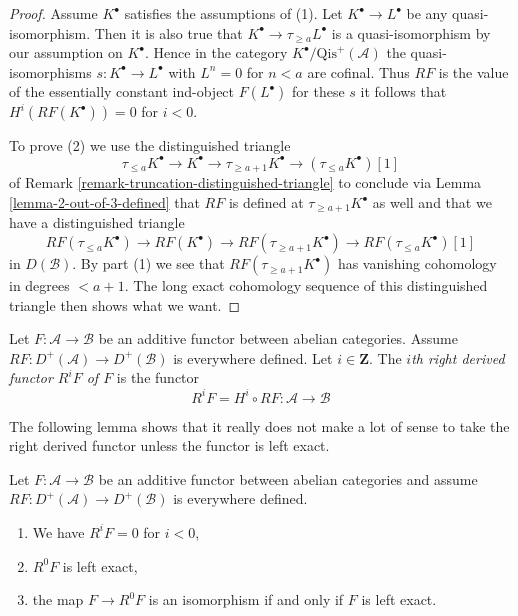 \begin{proof}
Assume $K^\bullet$ satisfies the assumptions of (1).
Let $K^\bullet \to L^\bullet$ be any quasi-isomorphism.
Then it is also true that $K^\bullet \to \tau_{\geq a}L^\bullet$
is a quasi-isomorphism by our assumption on $K^\bullet$.
Hence in the category $K^\bullet/\text{Qis}^{+}(\mathcal{A})$ the
quasi-isomorphisms $s : K^\bullet \to L^\bullet$ with $L^n = 0$ for $n < a$
are cofinal. Thus $RF$ is the value of the essentially constant
ind-object $F(L^\bullet)$ for these $s$ it follows that
$H^i(RF(K^\bullet)) = 0$ for $i < 0$.

\medskip\noindent
To prove (2) we use the distinguished triangle
$$
\tau_{\leq a}K^\bullet \to K^\bullet \to \tau_{\geq a + 1}K^\bullet
\to (\tau_{\leq a}K^\bullet)[1]
$$
of Remark \ref{remark-truncation-distinguished-triangle} to conclude
via Lemma \ref{lemma-2-out-of-3-defined} that
$RF$ is defined at $\tau_{\geq a + 1}K^\bullet$ as well and that we have
a distinguished triangle
$$
RF(\tau_{\leq a}K^\bullet) \to RF(K^\bullet) \to RF(\tau_{\geq a + 1}K^\bullet)
\to RF(\tau_{\leq a}K^\bullet)[1]
$$
in $D(\mathcal{B})$. By part (1) we see that $RF(\tau_{\geq a + 1}K^\bullet)$
has vanishing cohomology in degrees $< a + 1$. The long exact cohomology
sequence of this distinguished triangle then shows what we want.
\end{proof}

\begin{definition}
\label{definition-higher-derived-functors}
Let $F : \mathcal{A} \to \mathcal{B}$ be an additive functor
between abelian categories. Assume
$RF : D^{+}(\mathcal{A}) \to D^{+}(\mathcal{B})$ is everywhere
defined. Let $i \in \mathbf{Z}$.
The {\it $i$th right derived functor $R^iF$ of $F$} is the functor
$$
R^iF = H^i \circ RF :
\mathcal{A}
\longrightarrow
\mathcal{B}
$$
\end{definition}

\noindent
The following lemma shows that it really does not make a lot
of sense to take the right derived functor unless the functor
is left exact.

\begin{lemma}
\label{lemma-left-exact-higher-derived}
Let $F : \mathcal{A} \to \mathcal{B}$ be an additive functor
between abelian categories and assume
$RF : D^{+}(\mathcal{A}) \to D^{+}(\mathcal{B})$ is everywhere
defined.
\begin{enumerate}
\item We have $R^iF = 0$ for $i < 0$,
\item $R^0F$ is left exact,
\item the map $F \to R^0F$ is an isomorphism if and
only if $F$ is left exact.
\end{enumerate}
\end{lemma}

